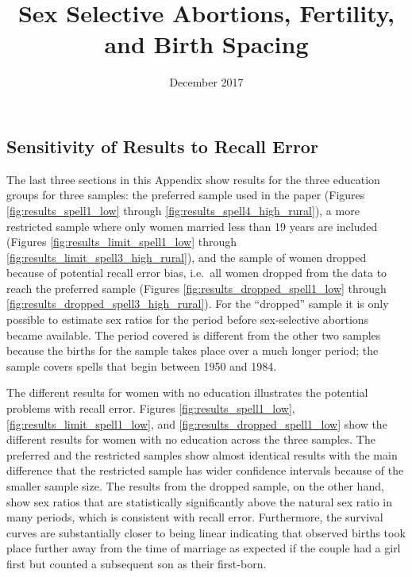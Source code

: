 \documentclass[12pt,letterpaper]{article}
\title{Sex Selective Abortions, Fertility, and Birth Spacing
}
\author{}
\date{December 2017}
\begin{document}
\graphicspath{{../figures/}}
\doublespacing

\appendix

\renewcommand\thefigure{\thesection.\arabic{figure}}    

\renewcommand\thetable{\thesection.\arabic{table}}    
\setcounter{table}{0}

\subsection{Sensitivity of Results to Recall Error}



The last three sections in this Appendix show results for the three education groups for 
three samples: the preferred sample used in the paper (Figures \ref{fig:results_spell1_low}
through \ref{fig:results_spell4_high_rural}), 
a more restricted sample where only women married less than 19 years are 
included (Figures \ref{fig:results_limit_spell1_low} through \ref{fig:results_limit_spell3_high_rural}),
and the sample of women dropped because of potential recall error bias, i.e.\ all women 
dropped from the data to reach the preferred sample (Figures \ref{fig:results_dropped_spell1_low}
through \ref{fig:results_dropped_spell3_high_rural}).
For the ``dropped'' sample it is only possible to estimate sex ratios for the period
before sex-selective abortions became available.
The period covered is different from the other two samples because the births for 
the sample takes place over a much longer period; the sample covers spells that begin
between 1950 and 1984.

The different results for women with no education illustrates the potential problems 
with recall error.
Figures \ref{fig:results_spell1_low}, \ref{fig:results_limit_spell1_low}, and 
\ref{fig:results_dropped_spell1_low} show the different results for women with no
education across the three samples.
The preferred and the restricted samples show almost identical results with the main
difference that the restricted sample has wider confidence intervals because of the
smaller sample size.
The results from the dropped sample, on the other hand, show sex ratios that are 
statistically significantly above the natural sex ratio in many periods, which is
consistent with recall error.
Furthermore, the survival curves are substantially closer to being linear indicating
that observed births took place further away from the time of marriage as expected if 
the couple had a girl first but counted a subsequent son as their first-born.
\end{document}

